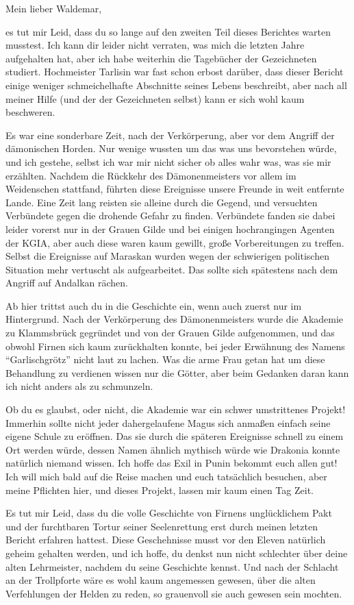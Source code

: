 Mein lieber Waldemar,

es tut mir Leid, dass du so lange auf den zweiten Teil dieses Berichtes warten musstest. 
Ich kann dir leider nicht verraten, was mich die letzten Jahre aufgehalten hat, aber ich habe weiterhin die Tagebücher der Gezeichneten studiert.
Hochmeister Tarlisin war fast schon erbost darüber, dass dieser Bericht einige weniger schmeichelhafte Abschnitte seines Lebens beschreibt, aber nach all meiner Hilfe (und der der Gezeichneten selbst) kann er sich wohl kaum beschweren.

Es war eine sonderbare Zeit, nach der Verkörperung, aber vor dem Angriff der dämonischen Horden.
Nur wenige wussten um das was uns bevorstehen würde, und ich gestehe, selbst ich war mir nicht sicher ob alles wahr was, was sie mir erzählten.
Nachdem die Rückkehr des Dämonenmeisters vor allem im Weidenschen stattfand, führten diese Ereignisse unsere Freunde in weit entfernte Lande.
Eine Zeit lang reisten sie alleine durch die Gegend, und versuchten Verbündete gegen die drohende Gefahr zu finden.
Verbündete fanden sie dabei leider vorerst nur in der Grauen Gilde und bei einigen hochrangingen Agenten der KGIA, aber auch diese waren kaum gewillt, große Vorbereitungen zu treffen.
Selbst die Ereignisse auf Maraskan wurden wegen der schwierigen politischen Situation mehr vertuscht als aufgearbeitet.
Das sollte sich spätestens nach dem Angriff auf Andalkan rächen.

Ab hier trittst auch du in die Geschichte ein, wenn auch zuerst nur im Hintergrund.
Nach der Verkörperung des Dämonenmeisters wurde die Akademie zu Klammsbrück gegründet und von der Grauen Gilde aufgenommen, und das obwohl Firnen sich kaum zurückhalten konnte, bei jeder Erwähnung des Namens ``Garlischgrötz'' nicht laut zu lachen. Was die arme Frau getan hat um diese Behandlung zu verdienen wissen nur die Götter, aber beim Gedanken daran kann ich nicht anders als zu schmunzeln.

Ob du es glaubst, oder nicht, die Akademie war ein schwer umstrittenes Projekt! Immerhin sollte nicht jeder dahergelaufene Magus sich anmaßen einfach seine eigene Schule zu eröffnen. Das sie durch die späteren Ereignisse schnell zu einem Ort werden würde, dessen Namen ähnlich mythisch würde wie Drakonia konnte natürlich niemand wissen.
Ich hoffe das Exil in Punin bekommt euch allen gut! Ich will mich bald auf die Reise machen und euch tatsächlich besuchen, aber meine Pflichten hier, und dieses Projekt, lassen mir kaum einen Tag Zeit.

Es tut mir Leid, dass du die volle Geschichte von Firnens unglücklichem Pakt und der furchtbaren Tortur seiner Seelenrettung erst durch meinen letzten Bericht erfahren hattest. Diese Geschehnisse musst vor den Eleven natürlich geheim gehalten werden, und ich hoffe, du denkst nun nicht schlechter über deine alten Lehrmeister, nachdem du seine Geschichte kennst.
Und nach der Schlacht an der Trollpforte wäre es wohl kaum angemessen gewesen, über die alten Verfehlungen der Helden zu reden, so grauenvoll sie auch gewesen sein mochten.


